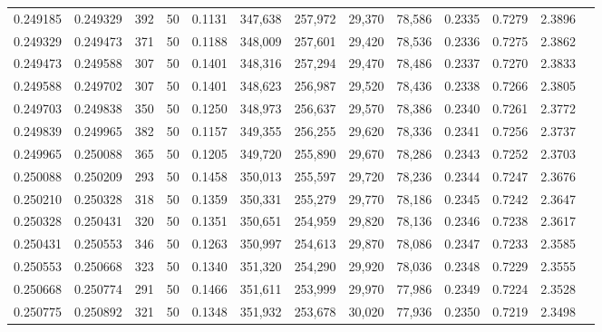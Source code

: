 \begin{tabular}{rrrrrrrrrrrrr}
0.249185 & 0.249329 &   392 &  50 &                                     0.1131 & 347,638 & 257,972 &  29,370 &  78,586 & 0.2335 & 0.7279 & 2.3896 \\
0.249329 & 0.249473 &   371 &  50 &                                     0.1188 & 348,009 & 257,601 &  29,420 &  78,536 & 0.2336 & 0.7275 & 2.3862 \\
0.249473 & 0.249588 &   307 &  50 &                                     0.1401 & 348,316 & 257,294 &  29,470 &  78,486 & 0.2337 & 0.7270 & 2.3833 \\
0.249588 & 0.249702 &   307 &  50 &                                     0.1401 & 348,623 & 256,987 &  29,520 &  78,436 & 0.2338 & 0.7266 & 2.3805 \\
0.249703 & 0.249838 &   350 &  50 &                                     0.1250 & 348,973 & 256,637 &  29,570 &  78,386 & 0.2340 & 0.7261 & 2.3772 \\
0.249839 & 0.249965 &   382 &  50 &                                     0.1157 & 349,355 & 256,255 &  29,620 &  78,336 & 0.2341 & 0.7256 & 2.3737 \\
0.249965 & 0.250088 &   365 &  50 &                                     0.1205 & 349,720 & 255,890 &  29,670 &  78,286 & 0.2343 & 0.7252 & 2.3703 \\
0.250088 & 0.250209 &   293 &  50 &                                     0.1458 & 350,013 & 255,597 &  29,720 &  78,236 & 0.2344 & 0.7247 & 2.3676 \\
0.250210 & 0.250328 &   318 &  50 &                                     0.1359 & 350,331 & 255,279 &  29,770 &  78,186 & 0.2345 & 0.7242 & 2.3647 \\
0.250328 & 0.250431 &   320 &  50 &                                     0.1351 & 350,651 & 254,959 &  29,820 &  78,136 & 0.2346 & 0.7238 & 2.3617 \\
0.250431 & 0.250553 &   346 &  50 &                                     0.1263 & 350,997 & 254,613 &  29,870 &  78,086 & 0.2347 & 0.7233 & 2.3585 \\
0.250553 & 0.250668 &   323 &  50 &                                     0.1340 & 351,320 & 254,290 &  29,920 &  78,036 & 0.2348 & 0.7229 & 2.3555 \\
0.250668 & 0.250774 &   291 &  50 &                                     0.1466 & 351,611 & 253,999 &  29,970 &  77,986 & 0.2349 & 0.7224 & 2.3528 \\
0.250775 & 0.250892 &   321 &  50 &                                     0.1348 & 351,932 & 253,678 &  30,020 &  77,936 & 0.2350 & 0.7219 & 2.3498 \\

\end{tabular}
